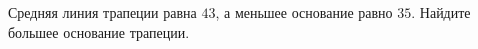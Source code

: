 \begin{ex}
	\begin{condition}
		Средняя линия трапеции равна \( 43 \), а меньшее основание равно \( 35 \). Найдите большее основание трапеции.
	\end{condition}
\end{ex}